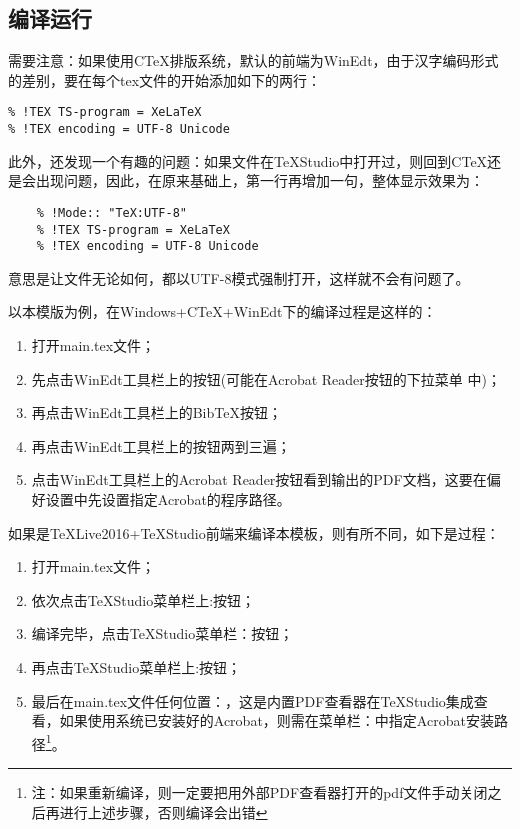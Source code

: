 \subsection{编译运行}

需要注意：如果使用C\TeX 排版系统，默认的前端为WinEdt，由于汉字编码形式的差别，要在每个tex文件的开始添加如下的两行：
\begin{lstlisting}
% !TEX TS-program = XeLaTeX
% !TEX encoding = UTF-8 Unicode
\end{lstlisting}

此外，还发现一个有趣的问题：如果文件在\TeX{}Studio中打开过，则回到C\TeX{}还是会出现问题，因此，在原来基础上，第一行再增加一句，整体显示效果为：
\begin{lstlisting}
	% !Mode:: "TeX:UTF-8"
	% !TEX TS-program = XeLaTeX
	% !TEX encoding = UTF-8 Unicode
\end{lstlisting}
意思是让文件无论如何，都以UTF-8模式强制打开，这样就不会有问题了。

以本模版为例，在Windows+C\TeX{}+WinEdt下的编译过程是这样的：
\begin{enumerate}
\item 打开main.tex文件；
\item 先点击WinEdt工具栏上的\XeLaTeX{}按钮(可能在Acrobat Reader按钮的下拉菜单
  中)；
\item 再点击WinEdt工具栏上的Bib\TeX{}按钮；
\item 再点击WinEdt工具栏上的\XeLaTeX{}按钮两到三遍；
\item 点击WinEdt工具栏上的Acrobat Reader按钮看到输出的PDF文档，这要在偏好设置中先设置指定Acrobat的程序路径。
\end{enumerate}

如果是\TeX{}Live2016+\TeX{}Studio前端来编译本模板，则有所不同，如下是过程：
\begin{enumerate}
	\item 打开main.tex文件；
	\item 依次点击\TeX{}Studio菜单栏上:按钮；
	\item 编译完毕，点击\TeX{}Studio菜单栏：按钮；
	\item 再点击\TeX{}Studio菜单栏上:按钮；
	\item 最后在main.tex文件任何位置：，这是内置PDF查看器在\TeX{}Studio集成查看，如果使用系统已安装好的Acrobat，则需在菜单栏：中指定Acrobat安装路径\footnote{\kai 注：如果重新编译，则一定要把用外部PDF查看器打开的pdf文件手动关闭之后再进行上述步骤，否则编译会出错}。
\end{enumerate}

